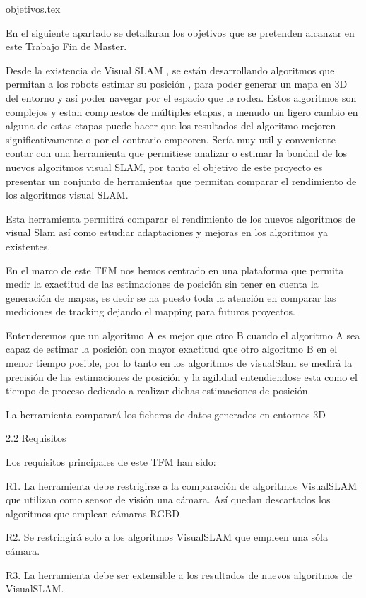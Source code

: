 objetivos.tex


En el siguiente apartado se detallaran los objetivos que se pretenden alcanzar en este Trabajo Fin de Master.

Desde la existencia de Visual SLAM , se están desarrollando algoritmos que permitan a los robots estimar su posición , para poder generar un mapa en 3D del entorno y así poder navegar por el espacio que le rodea. Estos algoritmos son complejos y estan compuestos de múltiples etapas, a menudo un ligero cambio en alguna de estas etapas puede hacer que los resultados del algoritmo mejoren significativamente o por el contrario empeoren. Sería muy util y conveniente contar con una herramienta que permitiese analizar o estimar la bondad de los nuevos algoritmos visual SLAM, por tanto el objetivo de este proyecto es presentar un conjunto de herramientas que permitan comparar el rendimiento de los algoritmos visual SLAM.

Esta herramienta permitirá comparar el rendimiento de los nuevos algoritmos de visual Slam así como estudiar adaptaciones y mejoras en los algoritmos ya existentes.

En el marco de este TFM nos hemos centrado en una plataforma que permita medir la exactitud de las estimaciones de posición sin tener en cuenta la generación de mapas, es decir se ha puesto toda la atención en comparar las mediciones de tracking dejando el mapping para futuros proyectos. 

Entenderemos que un algoritmo A es mejor que otro B cuando el algoritmo A sea capaz de estimar la posición con mayor exactitud que otro algoritmo B en el menor tiempo posible, por lo tanto en los algoritmos de visualSlam se medirá la precisión de las estimaciones de posición y la agilidad entendiendose esta como el tiempo de proceso dedicado a realizar dichas estimaciones de posición. 

La herramienta comparará los ficheros de datos generados en entornos 3D

2.2 Requisitos

Los requisitos principales de este TFM han sido:

	R1. La herramienta debe restrigirse a la comparación de algoritmos VisualSLAM que utilizan como sensor de visión una cámara. Así quedan descartados los algoritmos que emplean cámaras RGBD

	R2. Se restringirá solo a los algoritmos VisualSLAM que empleen una sóla cámara.

	R3. La herramienta debe ser extensible a los resultados de nuevos algoritmos de VisualSLAM.

